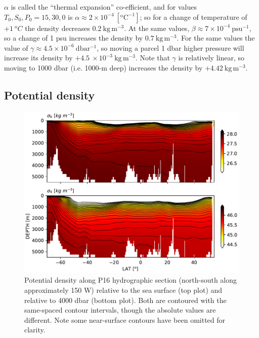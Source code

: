 $\alpha$ is called the ``thermal expansion'' co-efficient, and for values  $T_0, S_0, P_0 = 15, 30, 0$ is $\alpha \approx 2\times 10^{-4}\ \mathrm{[^oC^{-1}]}$; so for a change of temperature of $+1\ ^oC$ the density decreases $0.2 \ \mathrm{kg\, m^{-3}}$.  At the same values, $\beta \approx 7\times10^{-4}\ \mathrm{psu^{-1}}$, so a change of 1 psu increases the density by $0.7 \ \mathrm{kg\, m^{-3}}$.  For the same values the value of $\gamma \approx 4.5\times10^{-6} \ \mathrm{dbar^{-1}}$, so moving a parcel 1 dbar higher pressure will increase its density by $+4.5\ \times 10^{-3} \ \mathrm{kg\, m^{-3}}$.  Note that $\gamma$ is relatively linear, so moving to 1000 dbar (i.e. 1000-m deep) increases the density by $+4.42\ \mathrm{kg\, m^{-3}}$.   

\subsection{Potential density}
\label{sec:potential-density}

\begin{figure}[hbt]
  \begin{center}
    \includegraphics[width=4.5in]{figs/P16Pden.pdf}
    \caption{Potential density along P16 hydrographic section (north-south along approximately 150 W) relative to the sea surface (top plot) and relative to 4000 dbar (bottom plot).  Both are contoured with the same-spaced contour intervals, though the absolute values are different.  Note some near-surface contours have been omitted for clarity.}
    \label{fig:P16Pden}  
  \end{center}
\end{figure}


